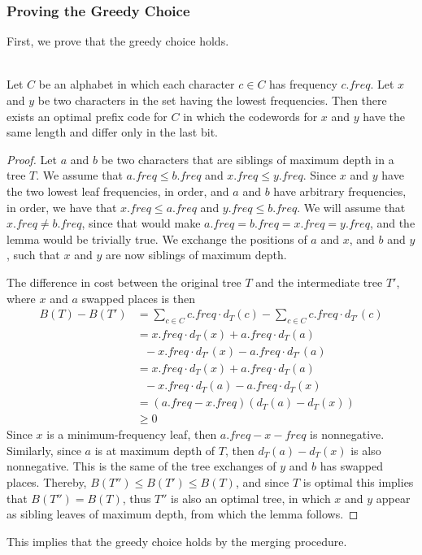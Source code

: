 \subsubsection{Proving the Greedy Choice}
First, we prove that the greedy choice holds.

\begin{lemma} \cite[16.2, p. 433]{clrs} \\
\label{lemma:16.2}
\textnormal
{
	Let $C$ be an alphabet in which each character $c \in C$ has frequency
	$c.freq$. Let $x$ and $y$ be two characters in the set having the lowest
	frequencies. Then there exists an optimal prefix code for $C$ in which the
	codewords for $x$ and $y$ have the same length and differ only in the last
	bit.
}
\end{lemma}

\begin{proof}
	Let $a$ and $b$ be two characters that are siblings of maximum depth in a
	tree $T$. We assume that $a.freq \leq b.freq$ and $x.freq \leq y.freq$.
	Since $x$ and $y$ have the two lowest leaf frequencies, in order, and $a$
	and $b$ have arbitrary frequencies, in order, we have that $x.freq \leq
	a.freq$ and $y.freq \leq b.freq$. We will assume that $x.freq \neq
	b.freq$, since that would make $a.freq = b.freq = x.freq = y.freq$, and
	the lemma would be trivially true. We exchange the positions of $a$ and
	$x$, and $b$ and $y$, such that $x$ and $y$ are now siblings of maximum
	depth.

	The difference in cost between the original tree $T$ and the intermediate
	tree $T'$, where $x$ and $a$ swapped places is then
	\begin{align}
		B(T) - B(T') &= \sum_{c \in C} c.freq \cdot d_T(c)
		- \sum_{c \in C} c.freq \cdot d_{T'}(c) \\
		&= x.freq \cdot d_T(x) + a.freq \cdot d_T(a) \\
		&{\ \ \ }- x.freq \cdot d_{T'}(x) - a.freq \cdot d_{T'}(a) \\
		&= x.freq \cdot d_T(x) + a.freq \cdot d_T(a) \\
		&{\ \ \ }- x.freq \cdot d_{T}(a) - a.freq \cdot d_{T}(x) \\
		&= (a.freq - x.freq)(d_T(a) - d_T(x)) \\
		&\geq 0 
	\end{align}
	Since $x$ is a minimum-frequency leaf, then $a.freq - x-freq$ is
	nonnegative. Similarly, since $a$ is at maximum depth of $T$, then $d_T(a)
	- d_T(x)$ is also nonnegative. This is the same of the tree exchanges of
	$y$ and $b$ has swapped places. Thereby, $B(T'') \leq B(T') \leq B(T)$,
	and since $T$ is optimal this implies that $B(T'') = B(T)$, thus $T''$ is
	also an optimal tree, in which $x$ and $y$ appear as sibling leaves of
	maximum depth, from which the lemma follows.
\end{proof}
This implies that the greedy choice holds by the merging procedure.

